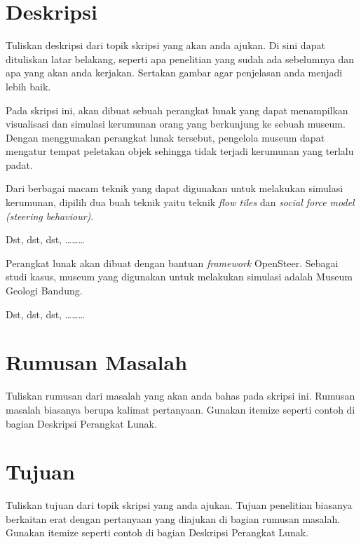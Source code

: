 \documentclass[a4paper,twoside]{article}
\begin{document}
\title{\@judultopik}
\author{\nama \textendash \@npm} 

\newcommand{\nama}{Lionov}
\newcommand{\@npm}{1997730020}
\newcommand{\@judultopik}{Simulasi Kerumunan di Museum} %
\newcommand{\jumpemb}{1} %
\newcommand{\tanggal}{01/01/1900}
\maketitle


\section{Deskripsi}
Tuliskan deskripsi dari topik skripsi yang akan anda ajukan. Di sini dapat dituliskan latar belakang, seperti apa penelitian yang sudah ada sebelumnya dan apa yang akan anda kerjakan. Sertakan gambar agar penjelasan anda menjadi lebih baik.

Pada skripsi ini, akan dibuat sebuah perangkat lunak yang dapat menampilkan visualisasi dan simulasi kerumunan orang yang berkunjung ke sebuah museum. Dengan menggunakan perangkat lunak tersebut, pengelola museum dapat mengatur tempat peletakan objek sehingga tidak terjadi kerumunan yang terlalu padat.

Dari berbagai macam teknik yang dapat digunakan untuk melakukan simulasi kerumunan, dipilih dua buah teknik yaitu teknik {\it flow tiles} dan {\it social force model (steering behaviour)}.

Dst, dst, dst, \ldots\ldots\ldots 

Perangkat lunak akan dibuat dengan bantuan {\it framework} OpenSteer. Sebagai studi kasus, museum yang digunakan untuk melakukan simulasi adalah Museum Geologi Bandung.

Dst, dst, dst, \ldots\ldots\ldots 

\section{Rumusan Masalah}
Tuliskan rumusan dari masalah yang akan anda bahas pada skripsi ini. Rumusan masalah biasanya berupa kalimat pertanyaan. Gunakan itemize seperti contoh di bagian Deskripsi Perangkat Lunak.

\section{Tujuan}
Tuliskan tujuan dari topik skripsi yang anda ajukan. Tujuan penelitian biasanya berkaitan erat dengan pertanyaan yang diajukan di bagian rumusan masalah. Gunakan itemize seperti contoh di bagian Deskripsi Perangkat Lunak.
\end{document}
